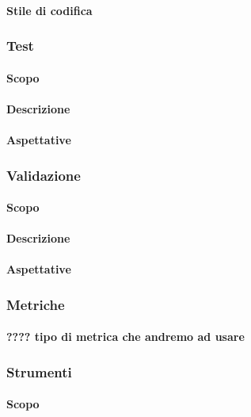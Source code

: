 \paragraph{Stile di codifica}

\subsubsection{Test}
\paragraph{Scopo}
\paragraph{Descrizione}
\paragraph{Aspettative}

\subsubsection{Validazione}
\paragraph{Scopo}
\paragraph{Descrizione}
\paragraph{Aspettative}

\subsubsection{Metriche}
\paragraph{???? tipo di metrica che andremo ad usare}

\subsubsection{Strumenti}
\paragraph{Scopo}









